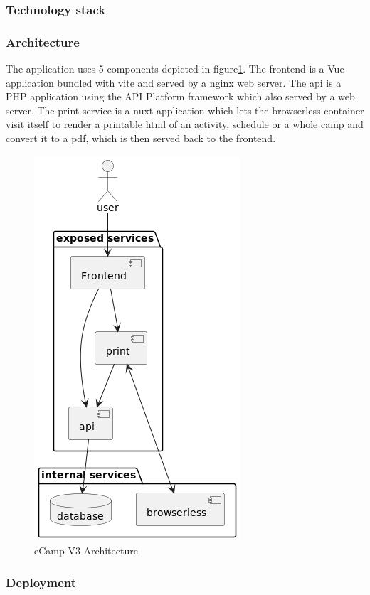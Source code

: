 \documentclass[conference]{IEEEtran}
\begin{document}
\subsubsection{Technology stack}

\subsubsection{Architecture}

The application uses 5 components depicted in figure\ref{fig:ecamp3-architecture}.
The frontend is a Vue application bundled with vite and served by a nginx web server.
The api is a PHP application using the API Platform framework which also served by a web server.
The print service is a nuxt application which lets the browserless container visit itself to render a printable
html of an activity, schedule or a whole camp and convert it to a pdf, which is then served back to the frontend.

\begin{figure}[h!]
	\includegraphics[height=\columnwidth]{sections/assets/ecamp3-architecture}
	\caption{eCamp V3 Architecture}
	\label{fig:ecamp3-architecture}
\end{figure}

\subsubsection{Deployment}
\end{document}
